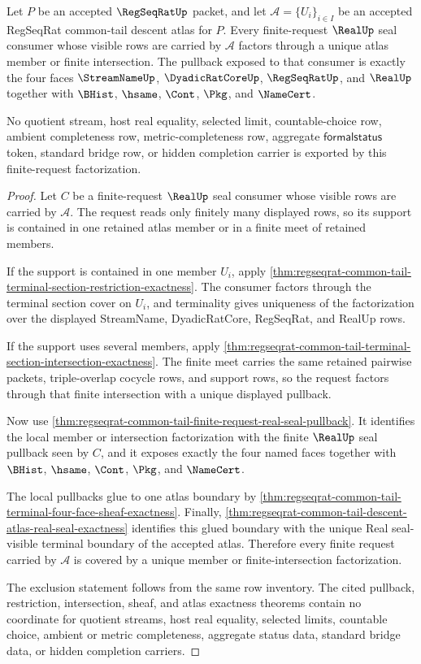 \begin{theorem}
\label{thm:regseqrat-common-tail-descent-atlas-finite-request-coverage}
Let $P$ be an accepted $\RegSeqRatUp$ packet, and let $\mathcal A=\{U_i\}_{i \in I}$ be an accepted RegSeqRat common-tail descent atlas for $P$. Every finite-request $\RealUp$ seal consumer whose visible rows are carried by $\mathcal A$ factors through a unique atlas member or finite intersection. The pullback exposed to that consumer is exactly the four faces $\StreamNameUp$, $\DyadicRatCoreUp$, $\RegSeqRatUp$, and $\RealUp$ together with $\BHist$, $\hsame$, $\Cont$, $\Pkg$, and $\NameCert$.

No quotient stream, host real equality, selected limit, countable-choice row, ambient completeness row, metric-completeness row, aggregate $\mathsf{formalstatus}$ token, standard bridge row, or hidden completion carrier is exported by this finite-request factorization.
\end{theorem}
\begin{proof}
Let $C$ be a finite-request $\RealUp$ seal consumer whose visible rows are carried by $\mathcal A$. The request reads only finitely many displayed rows, so its support is contained in one retained atlas member or in a finite meet of retained members.

If the support is contained in one member $U_i$, apply \autoref{thm:regseqrat-common-tail-terminal-section-restriction-exactness}. The consumer factors through the terminal section cover on $U_i$, and terminality gives uniqueness of the factorization over the displayed StreamName, DyadicRatCore, RegSeqRat, and RealUp rows.

If the support uses several members, apply \autoref{thm:regseqrat-common-tail-terminal-section-intersection-exactness}. The finite meet carries the same retained pairwise packets, triple-overlap cocycle rows, and support rows, so the request factors through that finite intersection with a unique displayed pullback.

Now use \autoref{thm:regseqrat-common-tail-finite-request-real-seal-pullback}. It identifies the local member or intersection factorization with the finite $\RealUp$ seal pullback seen by $C$, and it exposes exactly the four named faces together with $\BHist$, $\hsame$, $\Cont$, $\Pkg$, and $\NameCert$.

The local pullbacks glue to one atlas boundary by \autoref{thm:regseqrat-common-tail-terminal-four-face-sheaf-exactness}. Finally, \autoref{thm:regseqrat-common-tail-descent-atlas-real-seal-exactness} identifies this glued boundary with the unique Real seal-visible terminal boundary of the accepted atlas. Therefore every finite request carried by $\mathcal A$ is covered by a unique member or finite-intersection factorization.

The exclusion statement follows from the same row inventory. The cited pullback, restriction, intersection, sheaf, and atlas exactness theorems contain no coordinate for quotient streams, host real equality, selected limits, countable choice, ambient or metric completeness, aggregate status data, standard bridge data, or hidden completion carriers.
\end{proof}

